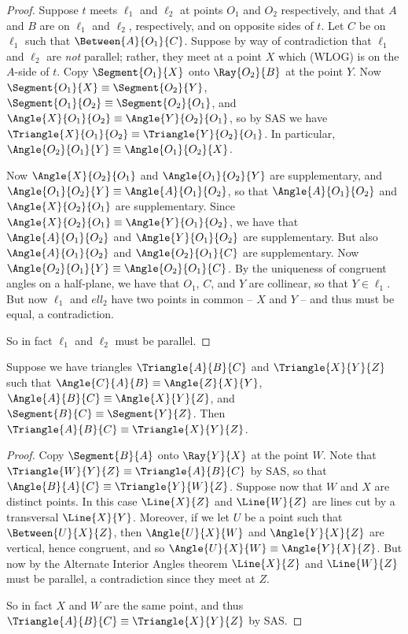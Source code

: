 \documentclass{article}
\begin{document}
\begin{proof}
Suppose $t$ meets $\ell_1$ and $\ell_2$ at points $O_1$ and $O_2$ respectively, and that $A$ and $B$ are on $\ell_1$ and $\ell_2$, respectively, and on opposite sides of $t$. Let $C$ be on $\ell_1$ such that $\Between{A}{O_1}{C}$. Suppose by way of contradiction that $\ell_1$ and $\ell_2$ are \emph{not} parallel; rather, they meet at a point $X$ which (WLOG) is on the $A$-side of $t$. Copy $\Segment{O_1}{X}$ onto $\Ray{O_2}{B}$ at the point $Y$. Now $\Segment{O_1}{X} \equiv \Segment{O_2}{Y}$, $\Segment{O_1}{O_2} \equiv \Segment{O_2}{O_1}$, and $\Angle{X}{O_1}{O_2} \equiv \Angle{Y}{O_2}{O_1}$, so by SAS we have $\Triangle{X}{O_1}{O_2} \equiv \Triangle{Y}{O_2}{O_1}$. In particular, $\Angle{O_2}{O_1}{Y} \equiv \Angle{O_1}{O_2}{X}$.

Now $\Angle{X}{O_2}{O_1}$ and $\Angle{O_1}{O_2}{Y}$ are supplementary, and $\Angle{O_1}{O_2}{Y} \equiv \Angle{A}{O_1}{O_2}$, so that $\Angle{A}{O_1}{O_2}$ and $\Angle{X}{O_2}{O_1}$ are supplementary. Since $\Angle{X}{O_2}{O_1} \equiv \Angle{Y}{O_1}{O_2}$, we have that $\Angle{A}{O_1}{O_2}$ and $\Angle{Y}{O_1}{O_2}$ are supplementary. But also $\Angle{A}{O_1}{O_2}$ and $\Angle{O_2}{O_1}{C}$ are supplementary. Now $\Angle{O_2}{O_1}{Y} \equiv \Angle{O_2}{O_1}{C}$. By the uniqueness of congruent angles on a half-plane, we have that $O_1$, $C$, and $Y$ are collinear, so that $Y \in \ell_1$. But now $\ell_1$ and $ell_2$ have two points in common -- $X$ and $Y$ -- and thus must be equal, a contradiction.

So in fact $\ell_1$ and $\ell_2$ must be parallel.  
\end{proof}

\begin{prop}[AAS]
Suppose we have triangles $\Triangle{A}{B}{C}$ and $\Triangle{X}{Y}{Z}$ such that $\Angle{C}{A}{B} \equiv \Angle{Z}{X}{Y}$, $\Angle{A}{B}{C} \equiv \Angle{X}{Y}{Z}$, and $\Segment{B}{C} \equiv \Segment{Y}{Z}$. Then $\Triangle{A}{B}{C} \equiv \Triangle{X}{Y}{Z}$.
\end{prop}

\begin{proof}
Copy $\Segment{B}{A}$ onto $\Ray{Y}{X}$ at the point $W$. Note that $\Triangle{W}{Y}{Z} \equiv \Triangle{A}{B}{C}$ by SAS, so that $\Angle{B}{A}{C} \equiv \Triangle{Y}{W}{Z}$. Suppose now that $W$ and $X$ are distinct points. In this case $\Line{X}{Z}$ and $\Line{W}{Z}$ are lines cut by a transversal $\Line{X}{Y}$. Moreover, if we let $U$ be a point such that $\Between{U}{X}{Z}$, then $\Angle{U}{X}{W}$ and $\Angle{Y}{X}{Z}$ are vertical, hence congruent, and so $\Angle{U}{X}{W} \equiv \Angle{Y}{X}{Z}$. But now by the Alternate Interior Angles theorem $\Line{X}{Z}$ and $\Line{W}{Z}$ must be parallel, a contradiction since they meet at $Z$.

So in fact $X$ and $W$ are the same point, and thus $\Triangle{A}{B}{C} \equiv \Triangle{X}{Y}{Z}$ by SAS.
\end{proof}
\end{document}
